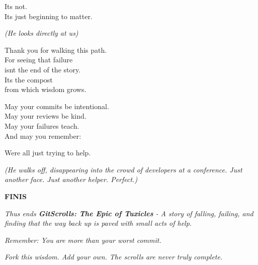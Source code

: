 It\textquotesingle s not.\\
It\textquotesingle s just beginning to matter.

\emph{(He looks directly at us)}

Thank you for walking this path.\\
For seeing that failure\\
isn\textquotesingle t the end of the story.\\
It\textquotesingle s the compost\\
from which wisdom grows.

May your commits be intentional.\\
May your reviews be kind.\\
May your failures teach.\\
And may you remember:

We\textquotesingle re all just trying to help.

\emph{(He walks off, disappearing into the crowd of developers at a conference. Just another face. Just another helper. Perfect.)}

\textbf{FINIS}

\bookdivider

\emph{Thus ends \textbf{GitScrolls: The Epic of Tuxicles} - A story of falling, failing, and finding that the way back up is paved with small acts of help.}

\emph{Remember: You are more than your worst commit.}

\bookdivider

\emph{Fork this wisdom. Add your own. The scrolls are never truly complete.}
